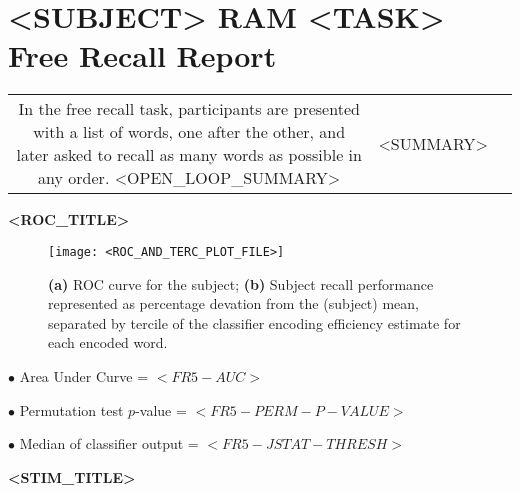\section*{<SUBJECT> RAM <TASK> Free Recall Report}

\begin{tabular}{ccc}
\begin{minipage}[htbp]{170pt}
In the free recall task, participants are presented with a list of words, one after the other, and later asked to recall as many words as possible in any order.
<OPEN_LOOP_SUMMARY>
\end{minipage}
&
<SUMMARY>
\end{tabular}

\vspace{1pc}

\begin{center}
\textbf{\Large <ROC_TITLE>}
\end{center}

\begin{figure}[!h]
\centering
\texttt{[image: <ROC\_AND\_TERC\_PLOT\_FILE>]}
\caption{\textbf{(a)} ROC curve for the subject;
\textbf{(b)} Subject recall performance represented as
percentage devation from the (subject) mean, separated by tercile
of the classifier encoding efficiency estimate for each encoded word.}
\end{figure}

$\bullet$ Area Under Curve = $<FR5-AUC>$

$\bullet$ Permutation test $p$-value = $<FR5-PERM-P-VALUE>$

$\bullet$ Median of classifier output = $<FR5-JSTAT-THRESH>$

\begin{center}
\textbf{\Large <STIM_TITLE>}
\end{center}

